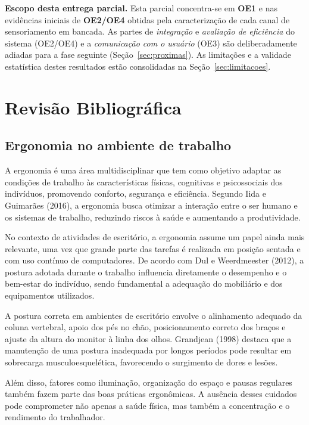 \documentclass[12pt,a4paper]{article}
\begin{document}
\noindent\textbf{Escopo desta entrega parcial.} Esta parcial concentra-se em
\textbf{OE1} e nas evidências iniciais de \textbf{OE2/OE4} obtidas pela
caracterização de cada canal de sensoriamento em bancada. As partes de
\emph{integração} e \emph{avaliação de eficiência} do sistema (OE2/OE4) e a
\emph{comunicação com o usuário} (OE3) são deliberadamente adiadas para a fase
seguinte (Seção~\ref{sec:proximas}). As limitações e a validade estatística destes
resultados estão consolidadas na Seção~\ref{sec:limitacoes}.

\section{Revisão Bibliográfica}

\subsection{Ergonomia no ambiente de trabalho}

A ergonomia é uma área multidisciplinar que tem como objetivo adaptar as condições
de trabalho às características físicas, cognitivas e psicossociais dos indivíduos,
promovendo conforto, segurança e eficiência. Segundo Iida e Guimarães (2016), a
ergonomia busca otimizar a interação entre o ser humano e os sistemas de trabalho,
reduzindo riscos à saúde e aumentando a produtividade.

No contexto de atividades de escritório, a ergonomia assume um papel ainda mais
relevante, uma vez que grande parte das tarefas é realizada em posição sentada e com
uso contínuo de computadores. De acordo com Dul e Weerdmeester (2012), a postura
adotada durante o trabalho influencia diretamente o desempenho e o bem-estar do
indivíduo, sendo fundamental a adequação do mobiliário e dos equipamentos utilizados.

A postura correta em ambientes de escritório envolve o alinhamento adequado da
coluna vertebral, apoio dos pés no chão, posicionamento correto dos braços e ajuste
da altura do monitor à linha dos olhos. Grandjean (1998) destaca que a manutenção de
uma postura inadequada por longos períodos pode resultar em sobrecarga
musculoesquelética, favorecendo o surgimento de dores e lesões.

Além disso, fatores como iluminação, organização do espaço e pausas regulares também
fazem parte das boas práticas ergonômicas. A ausência desses cuidados pode
comprometer não apenas a saúde física, mas também a concentração e o rendimento do
trabalhador.
\end{document}

